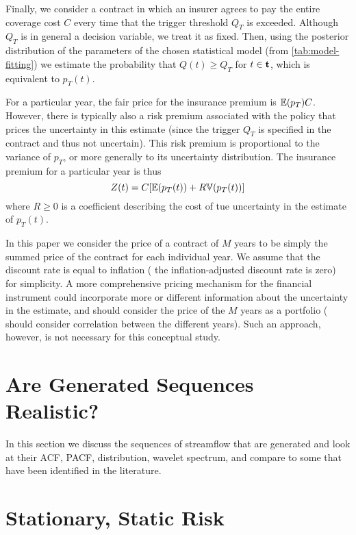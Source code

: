 \documentclass[11pt]{article}
\begin{document}
Finally, we consider a contract in which an insurer agrees to pay the entire coverage cost \(C\) every time that the trigger threshold \(Q_T\) is exceeded.
Although \(Q_T\) is in general a decision variable, we treat it as fixed.
Then, using the posterior distribution of the parameters of the chosen statistical model (from \cref{tab:model-fitting}) we estimate the probability that \(Q(t) \geq Q_T\) for \(t \in \vb{t}\), which is equivalent to \(p_T(t)\).

For a particular year, the fair price for the insurance premium is \(\mathbb{E} \qty(p_T) C\).
However, there is typically also a risk premium associated with the policy that prices the uncertainty in this estimate (since the trigger \(Q_T\) is specified in the contract and thus not uncertain).
This risk premium is proportional to the variance of \(p_T\), or more generally to its uncertainty distribution.
The insurance premium for a particular year is thus
\begin{equation} \label{eq:premium}
  Z(t) = C \qty[\mathbb{E} \qty(p_T(t)) + R \mathbb{V} \qty(p_T(t))]
\end{equation}
where \(R \geq 0\) is a coefficient describing the cost of tue uncertainty in the estimate of \(p_T(t)\).

In this paper we consider the price of a contract of \(M\) years to be simply the summed price of the contract for each individual year.
We assume that the discount rate is equal to inflation (\ie{} the inflation-adjusted discount rate is zero) for simplicity.
A more comprehensive pricing mechanism for the financial instrument could incorporate more or different information about the uncertainty in the estimate, and should consider the price of the \(M\) years as a portfolio (\ie{} should consider correlation between the different years).
Such an approach, however, is not necessary for this conceptual study.

\section{Are Generated Sequences Realistic?\label{sec:sequence-realistic}}

In this section we discuss the sequences of streamflow that are generated and look at their ACF, PACF, distribution, wavelet spectrum, \etc{} and compare to some that have been identified in the literature.


\section{Stationary, Static Risk}
\end{document}
